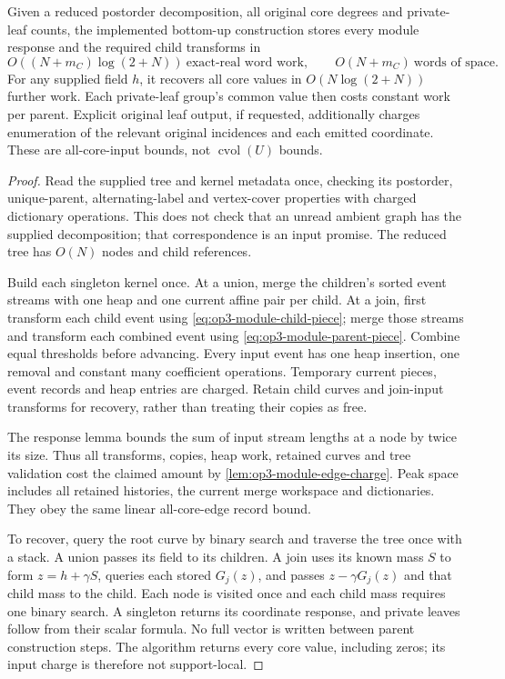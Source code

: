 \begin{theorem}
\label{thm:op3-supplied-modules}
Given a reduced postorder decomposition, all original core degrees and
private-leaf counts, the implemented bottom-up construction stores every
module response and the required child transforms in
\begin{equation}
 O((N+m_C)\log(2+N))\ \text{exact-real word work},\qquad
 O(N+m_C)\ \text{words of space}.
 \label{eq:op3-supplied-module-work}
\end{equation}
For any supplied field $h$, it recovers all core values in
$O(N\log(2+N))$ further work. Each private-leaf group's common value then
costs constant work per parent. Explicit original leaf output, if requested,
additionally charges enumeration of the relevant original incidences and
each emitted coordinate. These are all-core-input bounds, not
$\operatorname{cvol}(U)$ bounds.
\end{theorem}
\begin{proof}
Read the supplied tree and kernel metadata once, checking its postorder,
unique-parent, alternating-label and vertex-cover properties with charged
dictionary operations. This does not check that an unread ambient graph
has the supplied decomposition; that correspondence is an input promise.
The reduced tree has $O(N)$ nodes and child references.

Build each singleton kernel once. At a union, merge the children's sorted
event streams with one heap and one current affine pair per child. At a
join, first transform each child event using
\cref{eq:op3-module-child-piece}; merge those streams and transform each
combined event using \cref{eq:op3-module-parent-piece}. Combine equal
thresholds before advancing. Every input event has one heap insertion,
one removal and constant many coefficient operations. Temporary current
pieces, event records and heap entries are charged. Retain child curves
and join-input transforms for recovery, rather than treating their copies
as free.

The response lemma bounds the sum of input stream lengths at a node by
twice its size. Thus all transforms, copies, heap work, retained curves
and tree validation cost the claimed amount by
\cref{lem:op3-module-edge-charge}. Peak space includes all retained
histories, the current merge workspace and dictionaries. They obey the
same linear all-core-edge record bound.

To recover, query the root curve by binary search and traverse the tree
once with a stack. A union passes its field to its children. A join uses
its known mass $S$ to form $z=h+\gamma S$, queries each stored $G_j(z)$,
and passes $z-\gamma G_j(z)$ and that child mass to the child. Each node
is visited once and each child mass requires one binary search. A
singleton returns its coordinate response, and private leaves follow from
their scalar formula. No full vector is written between parent
construction steps. The algorithm returns every core value, including
zeros; its input charge is therefore not support-local.
\end{proof}

